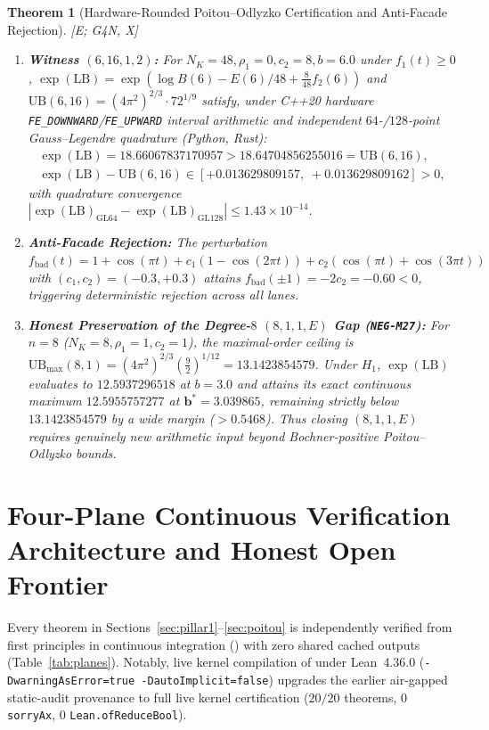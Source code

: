 \documentclass[11pt]{amsart}
\numberwithin{equation}{section}
\theoremstyle{plain}
\newtheorem{theorem}{Theorem}[section]
\theoremstyle{definition}\newtheorem{definition}[theorem]{Definition}
\theoremstyle{remark}\newtheorem{remark}[theorem]{Remark}
\newcommand{\ctag}[1]{\textup{\textsf{\scriptsize[#1]}}}
\begin{document}
\begin{theorem}[Hardware-Rounded Poitou--Odlyzko Certification and Anti-Facade Rejection]\label{thm:poitou}
\ctag{E; G4N, X}
\begin{enumerate}[label=(\arabic*),nosep]
\item \textbf{Witness $(6,16,1,2)$:} For $N_K=48, \rho_1=0, c_2=8, b=6.0$ under $f_1(t)\ge 0$, $\exp(\mathrm{LB}) = \exp(\log B(6) - E(6)/48 + \frac{8}{48}f_2(6))$ and $\mathrm{UB}(6,16) = (4\pi^2)^{2/3}\cdot 72^{1/9}$ satisfy, under C++20 hardware \texttt{FE\_DOWNWARD}/\texttt{FE\_UPWARD} interval arithmetic \cite{moore1966} and independent $64$-/$128$-point Gauss--Legendre quadrature (Python, Rust):
\begin{equation}\label{eq:poitou_witness}
\begin{gathered}
\exp(\mathrm{LB}) = 18.66067837170957 > 18.64704856255016 = \mathrm{UB}(6,16),\\
\exp(\mathrm{LB}) - \mathrm{UB}(6,16) \in [+0.013629809157,\; +0.013629809162] > 0,
\end{gathered}
\end{equation}
with quadrature convergence $|\exp(\mathrm{LB})_{\mathrm{GL64}}-\exp(\mathrm{LB})_{\mathrm{GL128}}| \le 1.43\times 10^{-14}$.
\item \textbf{Anti-Facade Rejection:} The perturbation $f_{\mathrm{bad}}(t) = 1+\cos(\pi t) + c_1(1-\cos(2\pi t)) + c_2(\cos(\pi t)+\cos(3\pi t))$ with $(c_1,c_2)=(-0.3,+0.3)$ attains $f_{\mathrm{bad}}(\pm 1) = -2c_2 = -0.60 < 0$, triggering deterministic rejection across all lanes.
\item \textbf{Honest Preservation of the Degree-$8$ $(8,1,1,E)$ Gap (\textup{\texttt{NEG-M27}}):} For $n=8$ ($N_K=8, \rho_1=1, c_2=1$), the maximal-order ceiling is $\mathrm{UB}_{\max}(8,1) = (4\pi^2)^{2/3}(\frac{9}{2})^{1/12} = 13.1423854579$. Under $H_1$, $\exp(\mathrm{LB})$ evaluates to $12.5937296518$ at $b=3.0$ and attains its exact continuous maximum $\mathbf{12.5955757277}$ at $\mathbf{b^* = 3.039865}$, remaining strictly below $13.1423854579$ by a wide margin ($>0.5468$). Thus closing $(8,1,1,E)$ requires genuinely new arithmetic input beyond Bochner-positive Poitou--Odlyzko bounds.
\end{enumerate}
\end{theorem}

\section{Four-Plane Continuous Verification Architecture and Honest Open Frontier}\label{sec:verification}
Every theorem in Sections~\ref{sec:pillar1}--\ref{sec:poitou} is independently verified from first principles in continuous integration () with zero shared cached outputs (Table~\ref{tab:planes}). Notably, live kernel compilation of  under Lean~4.36.0 (\texttt{-DwarningAsError=true -DautoImplicit=false}) upgrades the earlier air-gapped static-audit provenance to full live kernel certification ($20/20$ theorems, $0$ \texttt{sorryAx}, $0$ \texttt{Lean.ofReduceBool}).
\end{document}
